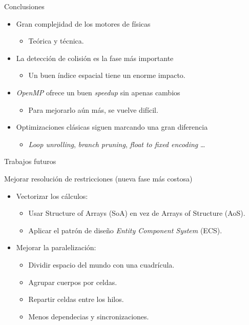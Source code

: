 \documentclass[10pt,xcolor=table]{beamer}
\begin{document}
\begin{frame}{Conclusiones}
  \begin{itemize}
    \item Gran complejidad de los motores de físicas
    \begin{itemize}
      \item Teórica y técnica.
    \end{itemize}
    \item La detección de colisión es la fase más importante
    \begin{itemize}
      \item Un buen índice espacial tiene un enorme impacto.
    \end{itemize}
    \item \textit{OpenMP} ofrece un buen \textit{speedup} sin apenas cambios
    \begin{itemize}
      \item Para mejorarlo aún más, se vuelve difícil.
    \end{itemize}
    \item Optimizaciones clásicas siguen marcando una gran diferencia
    \begin{itemize}
      \item \textit{Loop unrolling}, \textit{branch pruning}, \textit{float to fixed encoding} \ldots
    \end{itemize}
  \end{itemize}
\end{frame}

\begin{frame}{Trabajos futuros}
  \begin{block}{Mejorar resolución de restricciones (nueva fase más costosa)}
    \begin{itemize}
    \item Vectorizar los cálculos:
      \begin{itemize}
      \item Usar Structure of Arrays (SoA) en vez de Arrays of Structure (AoS).
      \item Aplicar el patrón de diseño \textit{Entity Component System} (ECS).
      \end{itemize}
    \item Mejorar la paralelización:
      \begin{itemize}
      \item Dividir espacio del mundo con una cuadrícula.
      \item Agrupar cuerpos por celdas.
      \item Repartir celdas entre los hilos.
      \item Menos dependecias y sincronizaciones.
      \end{itemize}
    \end{itemize}
  \end{block}
\end{frame}
\end{document}
